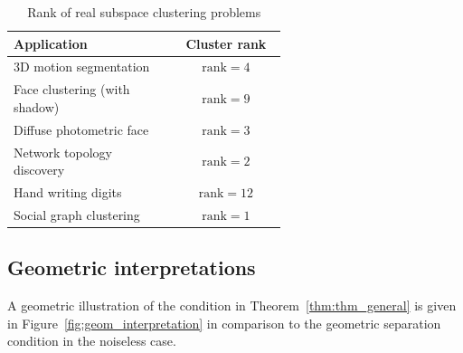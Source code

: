 \documentclass{ctexart}
\begin{document}
\begin{table}
  \centering
 \begin{tabular}{|p{0.6\linewidth}|c|}
   \hline
   \textbf{Application} & \textbf{Cluster rank}\\
   \hline
   3D motion segmentation \cite{costeira1998motion_seg} & $\mathrm{rank}=4$ \\\hline
   Face clustering (with shadow) \cite{basri2003lambertianface} & $\mathrm{rank}=9$ \\\hline
   Diffuse photometric face \cite{zhou2007PhotometricFace}& $\mathrm{rank}=3$ \\\hline
   Network topology discovery \cite{eriksson2011high_rankMC} & $\mathrm{rank}=2$ \\\hline
   Hand writing digits \cite{hastie1998MNIST}&  $\mathrm{rank}=12$\\\hline
   Social graph clustering \cite{xu2011graphclustering}& $\mathrm{rank}=1$ \\
   \hline
 \end{tabular}
  \caption{Rank of real subspace clustering problems}\label{tab:low_rank}
\end{table}




\subsection{Geometric interpretations}%
A geometric illustration of the condition in Theorem~\ref{thm:thm_general} is given in Figure~\ref{fig:geom_interpretation} in comparison to the geometric separation condition in the noiseless case.
\end{document}
